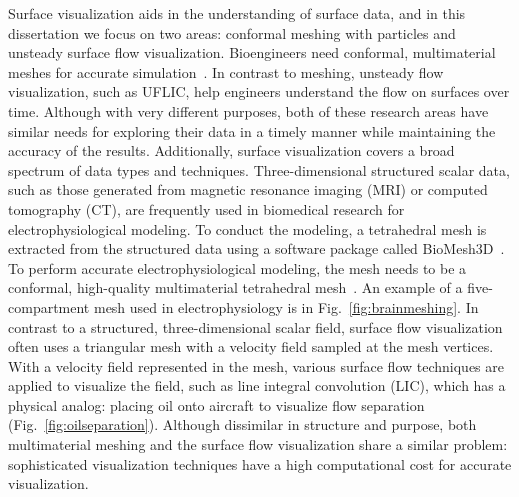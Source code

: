 Surface visualization aids in the understanding of surface data, and in this dissertation we focus on two areas: conformal meshing with particles and unsteady surface flow visualization. Bioengineers need conformal, multimaterial meshes for accurate simulation~\cite{SCI:Swe2010a}.  In contrast to meshing, unsteady flow visualization, such as UFLIC, help engineers understand the flow on surfaces over time.  Although with very different purposes, both of these research areas have similar needs for exploring their data in a timely manner while maintaining the accuracy of the results. Additionally, surface visualization covers a broad spectrum of data types and techniques. Three-dimensional structured scalar data, such as those generated from magnetic resonance imaging (MRI) or computed tomography (CT), are frequently used in biomedical research for electrophysiological modeling. To conduct the modeling, a tetrahedral mesh is extracted from the structured data using a software package called BioMesh3D~\cite{SCI:BioMesh3D}. To perform accurate electrophysiological modeling, the mesh needs to be a conformal, high-quality multimaterial tetrahedral mesh~\cite{SCI:Swe2010a}. An example of a five-compartment mesh used in electrophysiology is in Fig.~\ref{fig:brainmeshing}. In contrast to a structured, three-dimensional scalar field, surface flow visualization often uses a triangular mesh with a velocity field sampled at the mesh vertices. With a velocity field represented in the mesh, various surface flow techniques are applied to visualize the field, such as line integral convolution (LIC), which has a physical analog:  placing oil onto aircraft to visualize flow separation (Fig.~\ref{fig:oilseparation}). Although dissimilar in structure and purpose, both multimaterial meshing and the surface flow visualization share a similar problem: sophisticated visualization techniques have a high computational cost for accurate visualization.

